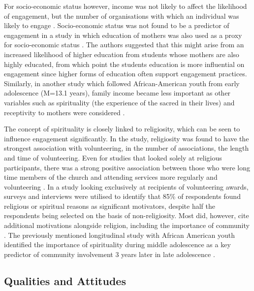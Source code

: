 For socio-economic status however, income was not likely to affect the likelihood of engagement, but the number of organisations with which an individual was likely to engage \citep{Penner2002}. Socio-economic status was not found to be a predictor of engagement in a study in which education of mothers was also used as a proxy for socio-economic status \citep{Barber2013}. The authors suggested that this might arise from an increased likelihood of higher education from students whose mothers are also highly educated, from which point the students education is more influential on engagement since higher forms of education often support engagement practices. Similarly, in another study which followed African-American youth from early adolescence (M=13.1 years), family income became less important as other variables such as spirituality (the experience of the sacred in their lives) and receptivity to mothers were considered \citep{Smetana2005}. 

The concept of spirituality is closely linked to religiosity, which can be seen to influence engagement significantly. In the \citet{Penner2002} study, religiosity was found to have the strongest association with volunteering, in the number of associations, the length and time of volunteering. Even for studies that looked solely at religious participants, there was a strong positive association between those who were long time members of the church and attending services more regularly and volunteering \citep{Garland2008}. In a study looking exclusively at recipients of volunteering awards, surveys and interviews were utilised to identify that 85\% of respondents found religious or spiritual reasons as significant motivators, despite half the respondents being selected on the basis of non-religiosity. Most did, however, cite additional motivations alongside religion, including the importance of community \citep{Perry2008}. The previously mentioned longitudinal study with African American youth identified the importance of spirituality during middle adolescence as a key predictor of community involvement 3 years later in late adolescence \citep{Smetana2005}.


\subsection{Qualities and Attitudes}

